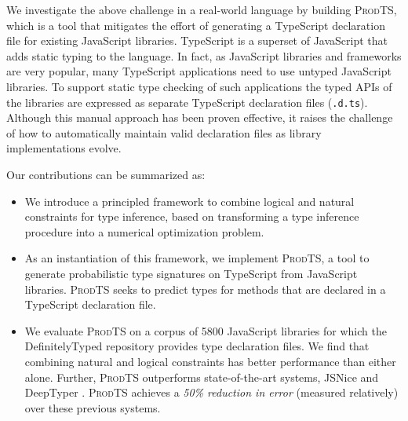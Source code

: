 \documentclass[sigplan,10pt,review,anonymous]{acmart} %
\newcommand{\prodts}{\textsc{ProdTS}\xspace}
\newcommand{\margincomment}[2]{\marginpar{\scriptsize\color{Maroon}#1 says: #2}}
\newcommand{\ivp}[1]{\margincomment{IVP}{#1}}
\theoremstyle{plain}
\theoremstyle{remark}
\theoremstyle{definition}
\begin{document}
We investigate the above challenge in a real-world language by building \prodts,
which is a tool that mitigates the effort of generating a
TypeScript declaration file for existing JavaScript libraries.
TypeScript is a superset of JavaScript that adds static typing to the language.
In fact, as JavaScript libraries and frameworks are very popular, many
TypeScript applications need to use untyped JavaScript libraries.
To support static type
checking of such applications the typed
APIs of the libraries are expressed as separate TypeScript
declaration files (\lstinline{.d.ts}).  Although this manual approach has been proven
effective, it raises the challenge of how to automatically maintain valid declaration files
as library implementations evolve.

Our contributions can be summarized as:
\begin{itemize}[label=\raisebox{0.25ex}{\tiny$\bullet$}]
  \item We introduce a principled framework to combine logical and natural constraints for type inference,
        based on transforming a type inference procedure into a numerical optimization problem.
  \item As an instantiation of this framework, we implement \prodts, a tool to generate probabilistic type
        signatures on TypeScript from JavaScript libraries.
        \prodts seeks to predict types for methods that are declared in a TypeScript declaration file.
  \item We evaluate \prodts on a corpus of 5800 JavaScript libraries for which
        the DefinitelyTyped repository provides type declaration files.
        We find that combining natural and logical constraints
        has better performance than either alone.
        Further, \prodts outperforms state-of-the-art systems,
        JSNice \cite{raychev15} and DeepTyper \cite{hellendoorn18}.
        \prodts achieves a \emph{50\% reduction in error} (measured relatively) over these previous systems.
\end{itemize}
\end{document}

